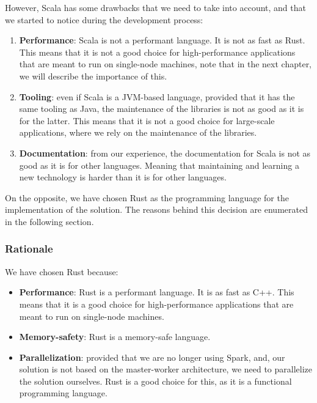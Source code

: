 However, Scala has some drawbacks that we need to take into account, and that we started to notice during the development process:

\begin{enumerate}
    \itemsep0.5em
    \item \textbf{Performance}: Scala is not a performant language. It is not as fast as Rust. This means that it is not a good choice for high-performance applications that are meant to run on single-node machines, note that in the next chapter, we will describe the importance of this.
    \item \textbf{Tooling}: even if Scala is a JVM-based language, provided that it has the same tooling as Java, the maintenance of the libraries is not as good as it is for the latter. This means that it is not a good choice for large-scale applications, where we rely on the maintenance of the libraries.
    \item \textbf{Documentation}: from our experience, the documentation for Scala is not as good as it is for other languages. Meaning that maintaining and learning a new technology is harder than it is for other languages.
\end{enumerate}

On the opposite, we have chosen Rust as the programming language for the implementation of the solution. The reasons behind this decision are enumerated in the following section.

\subsubsection{Rationale}

We have chosen Rust because:

\begin{itemize}
    \itemsep0.5em
    \item \textbf{Performance}: Rust is a performant language. It is as fast as C++. This means that it is a good choice for high-performance applications that are meant to run on single-node machines.
    \item \textbf{Memory-safety}: Rust is a memory-safe language.
    \item \textbf{Parallelization}: provided that we are no longer using Spark, and, our solution is not based on the master-worker architecture, we need to parallelize the solution ourselves. Rust is a good choice for this, as it is a functional programming language.
\end{itemize}

